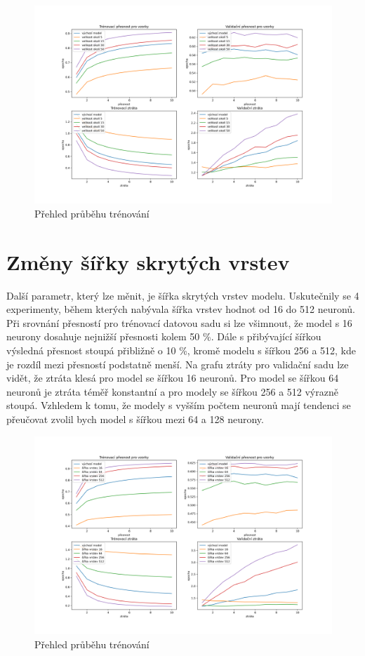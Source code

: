 \documentclass[FM,BP]{tulthesis}
\begin{document}
\begin{figure}[!htbp]
\centerline{\includegraphics[scale=.5]{training_course-margin.png}}
\caption{Přehled průběhu trénování}
\label{fig}
\end{figure}
\FloatBarrier

\section{Změny šířky skrytých vrstev}
Další parametr, který lze měnit, je šířka skrytých vrstev modelu. Uskutečnily se 4 experimenty, během kterých nabývala šířka vrstev hodnot od 16 do 512 neuronů. Při srovnání přesností pro trénovací datovou sadu si lze všimnout, že model s 16 neurony dosahuje nejnižší přesnosti kolem 50 \%. Dále s přibývající šířkou výsledná přesnost stoupá přibližně o 10 \%, kromě modelu s šířkou 256 a 512, kde je rozdíl mezi přesností podstatně menší.  Na grafu ztráty pro validační sadu lze vidět, že ztráta klesá pro model se šířkou 16 neuronů. Pro model se šířkou 64 neuronů je ztráta téměř konstantní a pro modely se šířkou 256 a 512 výrazně stoupá. Vzhledem k tomu, že modely s vyšším počtem neuronů mají tendenci se přeučovat zvolil bych model s šířkou mezi 64 a 128 neurony.

\begin{figure}[!htbp]
\centerline{\includegraphics[scale=.5]{training_course-width.png}}
\caption{Přehled průběhu trénování}
\label{fig}
\end{figure}
\FloatBarrier
\end{document}
